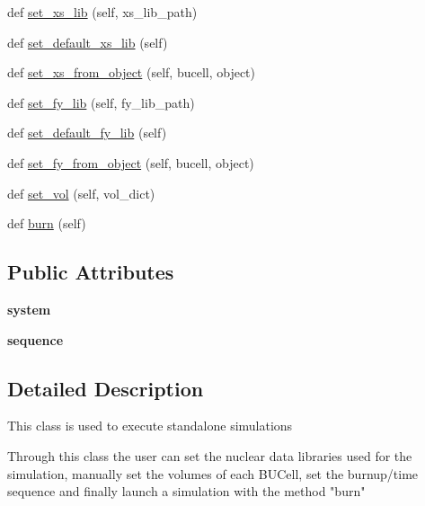 \begin{DoxyCompactItemize}
\item 
def \hyperlink{classonix_1_1standalone_1_1Stand__alone_a034fd40118a9221756de232f6986b48d}{set\+\_\+xs\+\_\+lib} (self, xs\+\_\+lib\+\_\+path)
\item 
def \hyperlink{classonix_1_1standalone_1_1Stand__alone_a6e5aec4da43990b0736cafa49ae67d8d}{set\+\_\+default\+\_\+xs\+\_\+lib} (self)
\item 
def \hyperlink{classonix_1_1standalone_1_1Stand__alone_a5a2c988ec8ec24e24d44a0d4e3a574ac}{set\+\_\+xs\+\_\+from\+\_\+object} (self, bucell, object)
\item 
def \hyperlink{classonix_1_1standalone_1_1Stand__alone_a94316bbe41b98a2fe92fe9e557b558c6}{set\+\_\+fy\+\_\+lib} (self, fy\+\_\+lib\+\_\+path)
\item 
def \hyperlink{classonix_1_1standalone_1_1Stand__alone_aba201eccf868c3c58dbd3c2c41cbcdaa}{set\+\_\+default\+\_\+fy\+\_\+lib} (self)
\item 
def \hyperlink{classonix_1_1standalone_1_1Stand__alone_a01d727d32b9a64f1b7ded3f2e7e4c833}{set\+\_\+fy\+\_\+from\+\_\+object} (self, bucell, object)
\item 
def \hyperlink{classonix_1_1standalone_1_1Stand__alone_acae12979c1005ff2899536738a02f481}{set\+\_\+vol} (self, vol\+\_\+dict)
\item 
def \hyperlink{classonix_1_1standalone_1_1Stand__alone_a1dbe96dbb003db048bb540a99d67831f}{burn} (self)
\end{DoxyCompactItemize}
\subsection*{Public Attributes}
\begin{DoxyCompactItemize}
\item 
\mbox{\label{classonix_1_1standalone_1_1Stand__alone_a5c12702d79d8d884a2d4ba60c195fe81}} 
{\bfseries system}
\item 
\mbox{\label{classonix_1_1standalone_1_1Stand__alone_a136338b0569a295d2e3061a3bb6efcbd}} 
{\bfseries sequence}
\end{DoxyCompactItemize}


\subsection{Detailed Description}
\begin{DoxyVerb}This class is used to execute standalone simulations

Through this class the user can set the nuclear data libraries used for the simulation,
manually set the volumes of each BUCell, set the burnup/time sequence and finally
launch a simulation with the method "burn" \end{DoxyVerb}
 

